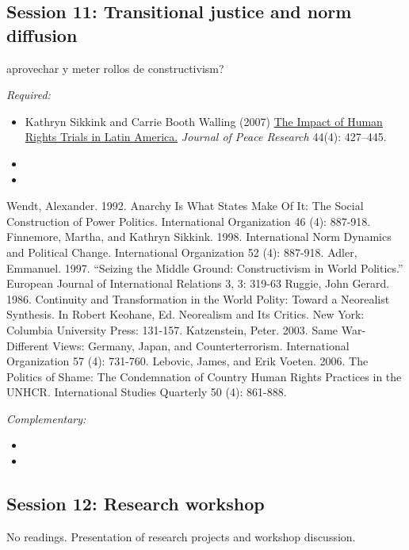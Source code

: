 \documentclass[12pt, a4paper]{article}
\begin{document}
\vspace{20pt}
\hline
\subsection*{Session 11: Transitional justice and norm diffusion}

aprovechar y meter rollos de constructivism?

\noindent\textit{Required:}

\begin{itemize}
  \item Kathryn Sikkink and Carrie Booth Walling (2007) \href{https://doi.org/10.1177/002234330707895}{The Impact of Human Rights Trials in Latin America.} \textit{Journal of Peace Research} 44(4): 427--445.
  \item {\color{red}{Kim HJ. 2012. Structural determinants of human rights prosecutions after democratic transition. J. Peace Res. 49(2):305–20}}
  \item {\color{red}{Kim HJ, Sikkink K. 2010. Explaining the deterrence effect of human rights prosecutions for transitional countries. Int. Stud. Q. 54:939–63}}
\end{itemize}

Wendt, Alexander. 1992. Anarchy Is What States Make Of It: The Social Construction of Power
Politics. International Organization 46 (4): 887-918.
Finnemore, Martha, and Kathryn Sikkink. 1998. International Norm Dynamics and Political
Change. International Organization 52 (4): 887-918.
Adler, Emmanuel. 1997. “Seizing the Middle Ground: Constructivism in World Politics.”
European Journal of International Relations 3, 3: 319-63
Ruggie, John Gerard. 1986. Continuity and Transformation in the World Polity: Toward a
Neorealist Synthesis. In Robert Keohane, Ed. Neorealism and Its Critics. New York: Columbia University Press: 131-157.
Katzenstein, Peter. 2003. Same War-Different Views: Germany, Japan, and Counterterrorism.
International Organization 57 (4): 731-760.
Lebovic, James, and Erik Voeten. 2006. The Politics of Shame: The Condemnation of Country
Human Rights Practices in the UNHCR. International Studies Quarterly 50 (4): 861-888.


\noindent\textit{Complementary:}

\begin{itemize}
  \item
  \item
\end{itemize}

\hline
\subsection*{Session 12: Research workshop}

No readings. Presentation of research projects and workshop discussion.
\end{document}
